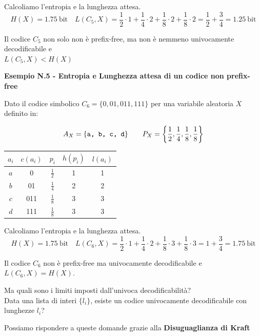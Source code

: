 Calcoliamo l'entropia e la lunghezza attesa.
$$
H(X) = 1.75\ \text{bit} \quad  L(C_5, X) = \frac{1}{2} \cdot 1 + \frac{1}{4} \cdot 2 + \frac{1}{8} \cdot 2 + \frac{1}{8} \cdot 2 = \frac{1}{2} + \frac{3}{4} = 1.25\ \text{bit}
$$

Il codice $C_5$ non solo non è prefix-free, ma non è nemmeno univocamente decodificabile e \\$L(C_5, X) < H(X)$

\textbf{Esempio N.5 - Entropia e Lunghezza attesa di un codice non prefix-free}

Dato il codice simbolico $C_6 = \{0, 01, 011, 111\}$ per una variabile aleatoria $X$ definito in:\\
\begin{minipage}{0.50\textwidth}
	$$
	A_X = \{\verb|a, b, c, d|\}\qquad P_X = \left\{\frac{1}{2}, \frac{1}{4}, \frac{1}{8}, \frac{1}{8}
	\right\}
	$$
\end{minipage}
\begin{minipage}{0.50\textwidth}
	\begin{table}[H]
		\centering
		\renewcommand{\arraystretch}{1.55}
		\begin{tabular}{c|c|c|c|c}
			$a_i$ & $c(a_i)$ & $p_i$ & $h(p_i)$ & $l(a_i)$ \\
			\hline
			$a$ & 0 & $\frac{1}{2}$ & 1 & 1 \\
			$b$ & 01 & $\frac{1}{4}$ & 2 & 2 \\
			$c$ & 011 & $\frac{1}{8}$ & 3 & 3 \\
			$d$ & 111 & $\frac{1}{8}$ & 3 & 3 \\
		\end{tabular}
	\end{table}
\end{minipage}

Calcoliamo l'entropia e la lunghezza attesa.
$$
H(X) = 1.75\ \text{bit} \quad  L(C_6, X) = \frac{1}{2} \cdot 1 + \frac{1}{4} \cdot 2 + \frac{1}{8} \cdot 3 + \frac{1}{8} \cdot 3 = 1 + \frac{3}{4} = 1.75\ \text{bit}
$$

Il codice $C_6$ non è prefix-free ma univocamente decodificabile e $L(C_6, X) = H(X)$.

Ma quali sono i limiti imposti dall'univoca decodificabilità?\\ Data una lista di interi $\{l_i\}$, esiste un codice univocamente decodificabile con lunghezze $l_i$?

Possiamo rispondere a queste domande grazie alla \textbf{Disuguaglianza di Kraft}

\newpage

